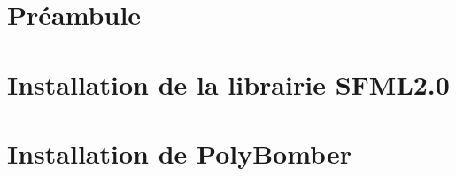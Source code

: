 \section{Préambule}


\section{Installation de la librairie SFML2.0}


\section{Installation de PolyBomber}
